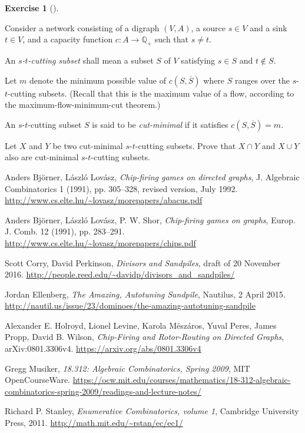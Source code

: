 \documentclass[numbers=enddot,12pt,final,onecolumn,notitlepage]{scrartcl}%
\newcounter{exer}
\theoremstyle{definition}
\newtheorem{exmp}[exer]{Exercise}
\newenvironment{exercise}[1][]
{\begin{exmp}[#1]\begin{leftbar}}
{\end{leftbar}\end{exmp}}
\newcommand{\QQ}{\mathbb{Q}}
\newcommand{\tup}[1]{\left( #1 \right)}
\begin{document}
\begin{exercise} \label{exe.flows-cuts.cut-lattice}
Consider a network consisting of a digraph
$\tup{V, A}$, a source $s \in V$ and a sink $t \in V$,
and a capacity function $c : A \to \QQ_+$
such that $s \neq t$.

An \textit{$s$-$t$-cutting subset} shall mean a subset
$S$ of $V$ satisfying $s \in S$ and $t \notin S$.

Let $m$ denote the minimum possible value of
$c \tup{S, \overline{S}}$ where $S$ ranges over the
$s$-$t$-cutting subsets.
(Recall that this is the maximum value of a
flow, according to the
maximum-flow-minimum-cut theorem.)

An $s$-$t$-cutting subset $S$ is said to be
\textit{cut-minimal} if it satisfies
$c \tup{S, \overline{S}} = m$.

Let $X$ and $Y$ be two cut-minimal $s$-$t$-cutting subsets.
Prove that $X \cap Y$ and $X \cup Y$ also are
cut-minimal $s$-$t$-cutting subsets.
\end{exercise}

\begin{thebibliography}{99999999}

Anders Bj\"orner, L\'aszl\'o Lov\'asz,
\textit{Chip-firing games on directed graphs},
J. Algebraic Combinatorics 1 (1991), pp. 305--328,
revised version, July 1992.
\newline\url{http://www.cs.elte.hu/~lovasz/morepapers/abacus.pdf}

Anders Bj\"orner, L\'aszl\'o Lov\'asz, P. W. Shor,
\textit{Chip-firing games on graphs},
Europ. J. Comb. 12 (1991), pp. 283--291.
\newline\url{http://www.cs.elte.hu/~lovasz/morepapers/chips.pdf}

Scott Corry, David Perkinson,
\textit{Divisors and Sandpiles},
draft of 20 November 2016.
\newline\url{http://people.reed.edu/~davidp/divisors_and_sandpiles/}

Jordan Ellenberg,
\textit{The Amazing, Autotuning Sandpile},
Nautilus, 2 April 2015.
\newline\url{http://nautil.us/issue/23/dominoes/the-amazing-autotuning-sandpile}

Alexander E. Holroyd, Lionel Levine, Karola M\'esz\'aros,
Yuval Peres, James Propp, David B. Wilson,
\textit{Chip-Firing and Rotor-Routing on Directed Graphs},
arXiv:0801.3306v4.
\newline\url{https://arxiv.org/abs/0801.3306v4}

Gregg Musiker,
\textit{18.312: Algebraic Combinatorics, Spring 2009},
MIT OpenCourseWare.
\newline\url{https://ocw.mit.edu/courses/mathematics/18-312-algebraic-combinatorics-spring-2009/readings-and-lecture-notes/}

Richard P. Stanley, \textit{Enumerative
Combinatorics, volume 1}, Cambridge University Press, 2011. \newline%
\url{http://math.mit.edu/~rstan/ec/ec1/}

\end{thebibliography}
\end{document}
